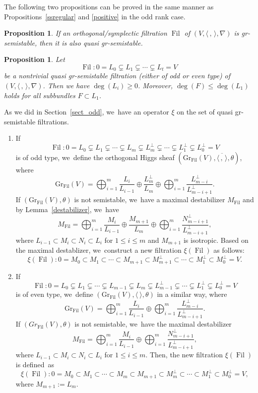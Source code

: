 \documentclass[JEP,XML,SOM,Unicode,published]{cedram}
\newcommand{\grsemistable}{gr\nobreakdash-semi\-stable\xspace}
\DeclareMathOperator{\Filt}{Fil}
\newcommand{\Gr}{\mathrm{Gr}}
\theoremstyle{plain}
\newtheorem{prop}[thm]{Proposition}
\theoremstyle{definition}
\begin{document}
The following two propositions can be proved in the same manner as Propositions~\ref{ssregular} and \ref{positive} in the odd rank case.

\begin{prop}\label{prop_ssregular_even}
If an orthogonal/symplectic filtration $\Filt$ of $(V,\langle \,, \, \rangle,\nabla)$ is \grsemistable, then it is also quasi \grsemistable.
\end{prop}

\begin{prop}\label{positiveeven}
Let
\[
\Filt: 0= L_0 \subsetneq L_1 \subsetneq \cdots \subsetneq L_t = V
\]
be a nontrivial quasi \grsemistable filtration (either of odd or even type) of $(V,\langle \,, \, \rangle,\nabla)$. Then we have $\deg(L_i)\geq 0$. Moreover, $\deg(F)\leq \deg(L_1)$ holds for all subbundles $F\subset L_1$.
\end{prop}

As we did in Section~\ref{sect_odd}, we~have an operator $\xi$ on the set of quasi \grsemistable filtrations.
\begin{enumerate}
\item If
\[
\Filt: 0= L_0 \subsetneq L_1 \subsetneq \cdots \subsetneq L_m \subsetneq L_m^\perp\subsetneq\cdots \subsetneq L_1^\perp\subsetneq L_0^\perp= V
\]
is of odd type, we~define the orthogonal Higgs sheaf $(\Gr_{\Filt}(V), \overline{\langle \,, \, \rangle},\theta)$, where
\[
\Gr_{\Filt}(V)=\mathop{\bigoplus}_{i=1}^{m} \frac{L_i}{L_{i-1}}\oplus \frac{L_m^\perp}{L_m}\oplus \mathop{\bigoplus}_{i=1}^{m} \frac{L_{m-i}^\perp}{L_{m-i+1}^\perp}.
\]
If $(\Gr_{\Filt}(V),\theta)$ is not semistable, we~have a maximal destabilizer $M_{\Filt}$ and by Lem\-ma~\ref{destabilizer}, we~have
\[
M_{\Filt}=\mathop{\bigoplus}_{i=1}^{m} \frac{M_i}{L_{i-1}}\oplus \frac{M_{m+1}}{L_m}\oplus \mathop{\bigoplus}_{i=1}^{m} \frac{N_{m-i+1}^\perp}{L_{m-i+1}^\perp},
\]
where $L_{i-1}\subset M_i\subset N_i\subset L_i$ for $1\leq i\leq m$ and $M_{m+1}$ is isotropic. Based on the maximal destablizer, we~construct a new filtration $\xi(\Filt)$ as follows:
\[
\xi(\Filt):0=M_0\subset M_1\subset\cdots\subset M_{m+1}\subset M_{m+1}^\perp\subset\cdots\subset M_1^\perp\subset M_0^\perp=V.
\]

\item If
\[
\Filt: 0= L_0 \subsetneq L_1 \subsetneq \cdots\subsetneq L_{m-1} \subsetneq L_m \subsetneq L_{m-1}^\perp\subsetneq\cdots \subsetneq L_1^\perp\subsetneq L_0^\perp= V
\]
is of even type, we~define $(\Gr_{\Filt}(V),\langle \ \rangle,\theta)$ in a similar way, where
\[
\Gr_{\Filt}(V)=\mathop{\bigoplus}_{i=1}^{m} \frac{L_i}{L_{i-1}}\oplus \mathop{\bigoplus}_{i=1}^{m} \frac{L_{m-i}^\perp}{L_{m-i+1}^\perp}.
\]
If $(Gr_{\Filt}(V),\theta)$ is not semistable, we~have the maximal destabilizer
\[
M_{\Filt}=\mathop{\bigoplus}_{i=1}^{m} \frac{M_i}{L_{i-1}}\oplus \mathop{\bigoplus}_{i=1}^{m} \frac{N_{m-i+1}^\perp}{L_{m-i+1}^\perp},
\]
where $L_{i-1}\subset M_i\subset N_i\subset L_i$ for $1\leq i\leq m$. Then, the new filtration $\xi(\Filt)$ is defined~as
\[
\xi(\Filt):0=M_0\subset M_1\subset\cdots\subset M_m \subset M_{m+1}\subset M_m^\perp\subset\cdots\subset M_1^\perp\subset M_0^\perp=V,
\]
where $M_{m+1}:=L_m$.
\end{enumerate}
\end{document}
